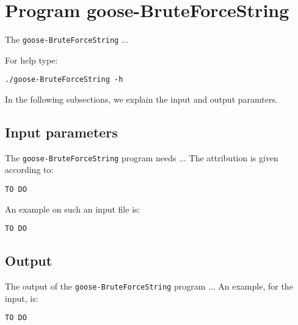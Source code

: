 \section{Program goose-BruteForceString}
The \texttt{goose-BruteForceString} ...

For help type:
\begin{lstlisting}
./goose-BruteForceString -h
\end{lstlisting}
In the following subsections, we explain the input and output paramters.

\subsection{Input parameters}

The \texttt{goose-BruteForceString} program needs ...
The attribution is given according to:
\begin{lstlisting}
TO DO
\end{lstlisting}

An example on such an input file is:
\begin{lstlisting}
TO DO
\end{lstlisting}

\subsection{Output}
The output of the \texttt{goose-BruteForceString} program ...
An example, for the input, is:
\begin{lstlisting}
TO DO
\end{lstlisting}